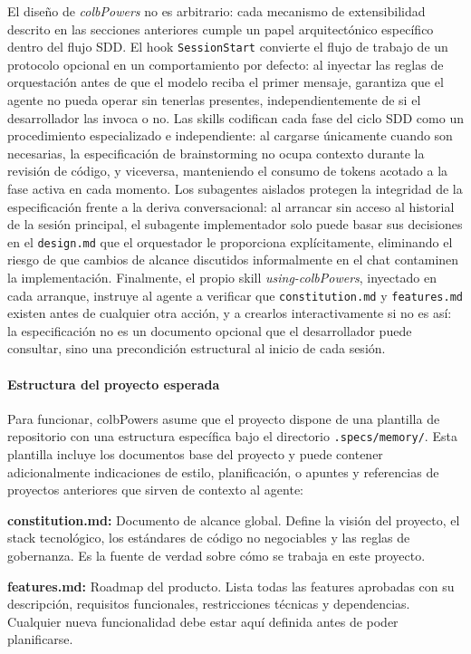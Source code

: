 \documentclass[11pt, letterpaper]{article}
\begin{document}
El diseño de \textit{colbPowers} no es arbitrario: cada mecanismo de extensibilidad descrito en las secciones anteriores cumple un papel arquitectónico específico dentro del flujo SDD. El hook \texttt{SessionStart} convierte el flujo de trabajo de un protocolo opcional en un comportamiento por defecto: al inyectar las reglas de orquestación antes de que el modelo reciba el primer mensaje, garantiza que el agente no pueda operar sin tenerlas presentes, independientemente de si el desarrollador las invoca o no. Las skills codifican cada fase del ciclo SDD como un procedimiento especializado e independiente: al cargarse únicamente cuando son necesarias, la especificación de brainstorming no ocupa contexto durante la revisión de código, y viceversa, manteniendo el consumo de tokens acotado a la fase activa en cada momento. Los subagentes aislados protegen la integridad de la especificación frente a la deriva conversacional: al arrancar sin acceso al historial de la sesión principal, el subagente implementador solo puede basar sus decisiones en el \texttt{design.md} que el orquestador le proporciona explícitamente, eliminando el riesgo de que cambios de alcance discutidos informalmente en el chat contaminen la implementación. Finalmente, el propio skill \textit{using-colbPowers}, inyectado en cada arranque, instruye al agente a verificar que \texttt{constitution.md} y \texttt{features.md} existen antes de cualquier otra acción, y a crearlos interactivamente si no es así: la especificación no es un documento opcional que el desarrollador puede consultar, sino una precondición estructural al inicio de cada sesión.

\paragraph{Estructura del proyecto esperada}
Para funcionar, colbPowers asume que el proyecto dispone de una plantilla de repositorio con una estructura específica bajo el directorio \texttt{.specs/memory/}. Esta plantilla incluye los documentos base del proyecto y puede contener adicionalmente indicaciones de estilo, planificación, o apuntes y referencias de proyectos anteriores que sirven de contexto al agente:

\textbf{constitution.md:} Documento de alcance global. Define la visión del proyecto, el stack tecnológico, los estándares de código no negociables y las reglas de gobernanza. Es la fuente de verdad sobre cómo se trabaja en este proyecto.

\textbf{features.md:} Roadmap del producto. Lista todas las features aprobadas con su descripción, requisitos funcionales, restricciones técnicas y dependencias. Cualquier nueva funcionalidad debe estar aquí definida antes de poder planificarse.
\end{document}
